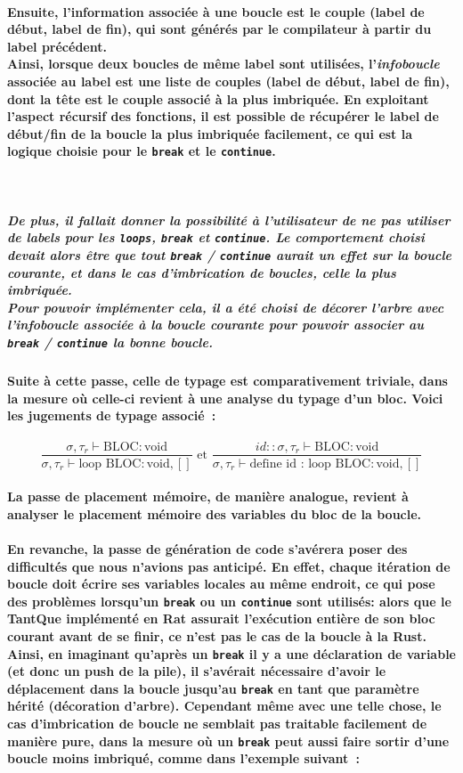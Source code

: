\documentclass[french]{article}
\newcommand{\jugementLoop}{
        \dfrac{\sigma, \tau_r \vdash \text{BLOC} : \text{void}}
              {\sigma, \tau_r \vdash \text{loop} \text{ BLOC} : \text{void}, []}
        }
\newcommand{\jugementLoopId}{
        \dfrac{id::\sigma, \tau_r \vdash \text{BLOC} : \text{void}}
              {\sigma, \tau_r \vdash \text{define id : loop} \text{ BLOC} : \text{void}, []}
        }
\begin{document}
\paragraph*{Ensuite, l'information associée à une boucle est le couple (label de début, label de fin), qui sont générés par le compilateur à partir du label précédent. \\
Ainsi, lorsque deux boucles de même label sont utilisées, l'\emph{infoboucle} associée au label est une liste de couples 
(label de début, label de fin), dont la tête est le couple associé à la plus imbriquée.
En exploitant l'aspect récursif des fonctions, il est possible de récupérer le label de début/fin de la boucle la plus imbriquée facilement,
ce qui est la logique choisie pour le \texttt{break} et le \texttt{continue}.}\,
\subparagraph*{De plus, il fallait donner la possibilité à l'utilisateur de ne pas utiliser de labels pour les \texttt{loops}, \texttt{break} et \texttt{continue}. Le comportement
choisi devait alors être que tout \texttt{break} / \texttt{continue} aurait un effet sur la boucle courante, et dans le cas d'imbrication de boucles, celle la 
plus imbriquée.\\
Pour pouvoir implémenter cela, il a été choisi de \emph{décorer l'arbre} avec l'infoboucle associée à la boucle courante pour pouvoir associer au \texttt{break} / \texttt{continue}
la bonne boucle.}
\paragraph*{Suite à cette passe, celle de typage est comparativement triviale, dans la mesure où celle-ci revient à une analyse
du typage d'un bloc. Voici les jugements de typage associé~:}
 \[\jugementLoop \text{ et } \jugementLoopId\]
\paragraph*{La passe de placement mémoire, de manière analogue, revient à analyser le placement mémoire des variables du bloc de la boucle.}
\paragraph*{En revanche, la passe de génération de code s'avérera poser des difficultés que nous n'avions pas anticipé. En effet, chaque itération de boucle doit
écrire ses variables locales au même endroit, ce qui pose des problèmes lorsqu'un \texttt{break} ou un \texttt{continue} sont utilisés: alors que le TantQue
implémenté en Rat assurait l'exécution entière de son bloc courant avant de se finir, ce n'est pas le cas de la boucle à la Rust. \\
Ainsi, en imaginant qu'après un \texttt{break} il y a une déclaration de variable (et donc un push de la pile), il s'avérait nécessaire
d'avoir le déplacement dans la boucle jusqu'au \texttt{break} en tant que paramètre hérité (décoration d'arbre). Cependant même avec une telle chose, 
le cas d'imbrication de boucle ne semblait pas traitable facilement de manière pure, dans la mesure où un \texttt{break} peut aussi faire sortir d'une boucle moins imbriqué, comme dans 
l'exemple suivant~:}
\end{document}
